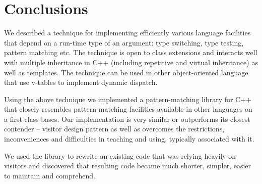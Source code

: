 \documentclass[preprint]{sigplanconf}
\begin{document}

\section{Conclusions} %
\label{sec:cc}

We described a technique for implementing efficiently various language 
facilities that depend on a run-time type of an argument: type switching, type 
testing, pattern matching etc. The technique is open to class extensions and 
interacts well with multiple inheritance in C++ (including repetitive and 
virtual inheritance) as well as templates. The technique can be used in 
other object-oriented language that use v-tables to implement dynamic dispatch.

Using the above technique we implemented a pattern-matching library for C++ that 
closely resembles pattern-matching facilities available in other languages on a 
first-class bases. Our implementation is very similar or outperforms its closest 
contender -- visitor design pattern as well as overcomes the restrictions, 
inconveniences and difficulties in teaching and using, typically associated with 
it.

We used the library to rewrite an existing code that was relying heavily on 
visitors and discovered that resulting code became much shorter, simpler, easier 
to maintain and comprehend.

\end{document}
